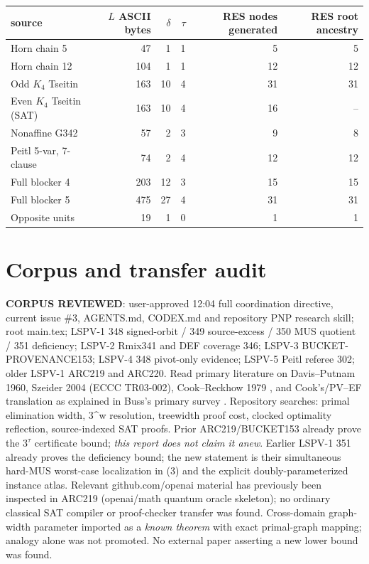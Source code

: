 \documentclass[11pt]{article}
\begin{document}
\begin{center}\begin{tabular}{lrrrrr}\toprule
source & $L$ ASCII bytes & $\delta$ & $\tau$ & RES nodes generated & RES root ancestry\\\midrule
Horn chain 5 & 47 & 1&1&5&5\\
Horn chain 12 &104&1&1&12&12\\
Odd $K_4$ Tseitin&163&10&4&31&31\\
Even $K_4$ Tseitin (SAT)&163&10&4&16&--\\
Nonaffine G342&57&2&3&9&8\\
Peitl 5-var, 7-clause&74&2&4&12&12\\
Full blocker 4&203&12&3&15&15\\
Full blocker 5&475&27&4&31&31\\
Opposite units&19&1&0&1&1\\\bottomrule
\end{tabular}\end{center}

\section*{Corpus and transfer audit}
\textbf{CORPUS REVIEWED}: user-approved 12:04 full coordination directive, current issue \#3, AGENTS.md, CODEX.md and repository PNP research skill; root main.tex; LSPV-1 348 signed-orbit / 349 source-excess / 350 MUS quotient / 351 deficiency; LSPV-2 Rmix341 and DEF coverage 346; LSPV-3 BUCKET-PROVENANCE153; LSPV-4 348 pivot-only evidence; LSPV-5 Peitl referee 302; older LSPV-1 ARC219 and ARC220. Read primary literature on Davis--Putnam 1960, Szeider 2004 (ECCC TR03-002), Cook--Reckhow 1979 \cite{CookReckhow1979}, and Cook's/PV--EF translation as explained in Buss's primary survey \cite{Buss1997}. Repository searches: primal elimination width, 3^w resolution, treewidth proof cost, clocked optimality reflection, source-indexed SAT proofs. Prior ARC219/BUCKET153 already prove the $3^\tau$ certificate bound; \emph{this report does not claim it anew}. Earlier LSPV-1 351 already proves the deficiency bound; the new statement is their simultaneous hard-MUS worst-case localization in (3) and the explicit doubly-parameterized instance atlas. Relevant github.com/openai material has previously been inspected in ARC219 (openai/math quantum oracle skeleton); no ordinary classical SAT compiler or proof-checker transfer was found. Cross-domain graph-width parameter imported as a \emph{known theorem} with exact primal-graph mapping; analogy alone was not promoted. No external paper asserting a new lower bound was found.
\end{document}
